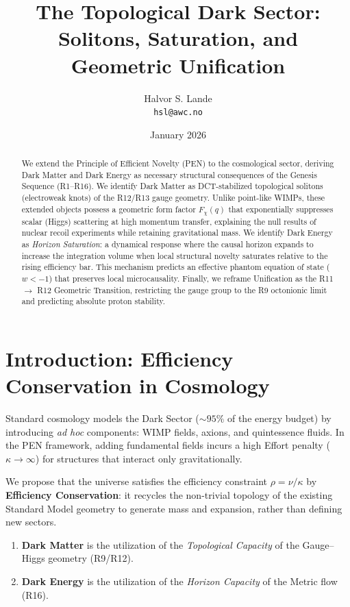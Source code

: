 \documentclass[11pt,a4paper]{article}
\title{%
    \Large\textbf{The Topological Dark Sector:}\\[0.3em]
    \large\textbf{Solitons, Saturation, and Geometric Unification}
}
\author{Halvor S. Lande\\
  \texttt{hsl@awc.no}\\[1em]}
\date{January 2026}
\theoremstyle{definition}
\theoremstyle{plain}
\theoremstyle{remark}
\newcommand{\eff}{\rho}
\newcommand{\novelty}{\nu}
\newcommand{\effort}{\kappa}
\begin{document}
\maketitle

\begin{abstract}
We extend the Principle of Efficient Novelty (PEN) to the cosmological sector, deriving Dark Matter and Dark Energy as necessary structural consequences of the Genesis Sequence (R1--R16). We identify Dark Matter as DCT-stabilized topological solitons (electroweak knots) of the R12/R13 gauge geometry. Unlike point-like WIMPs, these extended objects possess a geometric form factor $F_\chi(q)$ that exponentially suppresses scalar (Higgs) scattering at high momentum transfer, explaining the null results of nuclear recoil experiments while retaining gravitational mass. We identify Dark Energy as \emph{Horizon Saturation}: a dynamical response where the causal horizon expands to increase the integration volume when local structural novelty saturates relative to the rising efficiency bar. This mechanism predicts an effective phantom equation of state ($w < -1$) that preserves local microcausality. Finally, we reframe Unification as the R11 $\to$ R12 Geometric Transition, restricting the gauge group to the R9 octonionic limit and predicting absolute proton stability.
\end{abstract}

\tableofcontents
\newpage

\section{Introduction: Efficiency Conservation in Cosmology}

Standard cosmology models the Dark Sector ($\sim 95\%$ of the energy budget) by introducing \emph{ad hoc} components: WIMP fields, axions, and quintessence fluids. In the PEN framework, adding fundamental fields incurs a high Effort penalty ($\effort \to \infty$) for structures that interact only gravitationally.

We propose that the universe satisfies the efficiency constraint $\eff = \novelty/\effort$ by \textbf{Efficiency Conservation}: it recycles the non-trivial topology of the existing Standard Model geometry to generate mass and expansion, rather than defining new sectors.

\begin{enumerate}[label=\arabic*.]
    \item \textbf{Dark Matter} is the utilization of the \emph{Topological Capacity} of the Gauge--Higgs geometry (R9/R12).
    \item \textbf{Dark Energy} is the utilization of the \emph{Horizon Capacity} of the Metric flow (R16).
\end{enumerate}
\end{document}
